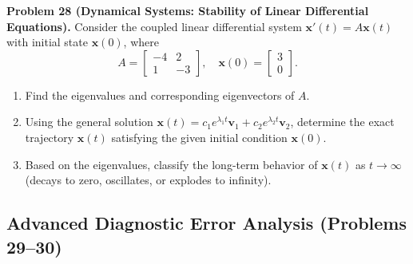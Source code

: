 \documentclass[11pt, letterpaper]{article}
\theoremstyle{definition}
\theoremstyle{remark}
\begin{document}
\textbf{Problem 28 (Dynamical Systems: Stability of Linear Differential Equations).}
Consider the coupled linear differential system $\mathbf{x}'(t) = A\mathbf{x}(t)$ with initial state $\mathbf{x}(0)$, where
\[
A = \begin{bmatrix} -4 & 2 \\ 1 & -3 \end{bmatrix}, \quad \mathbf{x}(0) = \begin{bmatrix} 3 \\ 0 \end{bmatrix}.
\]
\begin{enumerate}[label=(\alph*)]
    \item Find the eigenvalues and corresponding eigenvectors of $A$.
    \item Using the general solution $\mathbf{x}(t) = c_1 e^{\lambda_1 t}\mathbf{v}_1 + c_2 e^{\lambda_2 t}\mathbf{v}_2$, determine the exact trajectory $\mathbf{x}(t)$ satisfying the given initial condition $\mathbf{x}(0)$.
    \item Based on the eigenvalues, classify the long-term behavior of $\mathbf{x}(t)$ as $t \to \infty$ (decays to zero, oscillates, or explodes to infinity).
\end{enumerate}

\subsection{Advanced Diagnostic Error Analysis (Problems 29--30)}
\end{document}

